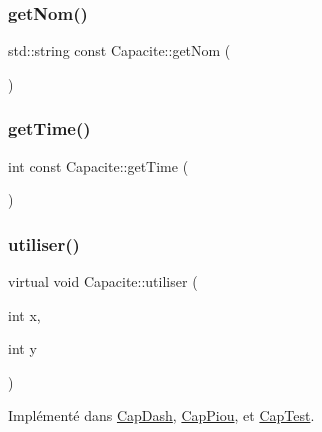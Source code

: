 \mbox{\label{class_capacite_a96218b289768ff461ffaaa0abe014a42}} 
\subsubsection{\texorpdfstring{get\+Nom()}{getNom()}}
{\footnotesize\ttfamily std\+::string const Capacite\+::get\+Nom (\begin{DoxyParamCaption}{ }\end{DoxyParamCaption})\hspace{0.3cm}{\ttfamily [inline]}}

\mbox{\label{class_capacite_a82e4eebf522c02163725872b288bfcf8}} 
\subsubsection{\texorpdfstring{get\+Time()}{getTime()}}
{\footnotesize\ttfamily int const Capacite\+::get\+Time (\begin{DoxyParamCaption}{ }\end{DoxyParamCaption})\hspace{0.3cm}{\ttfamily [inline]}}

\mbox{\label{class_capacite_a4d4f643987fcc2168567bf28a36ea418}} 
\subsubsection{\texorpdfstring{utiliser()}{utiliser()}}
{\footnotesize\ttfamily virtual void Capacite\+::utiliser (\begin{DoxyParamCaption}\item[{int}]{x,  }\item[{int}]{y }\end{DoxyParamCaption})\hspace{0.3cm}{\ttfamily [pure virtual]}}



Implémenté dans \hyperlink{class_cap_dash_ada59ecb62d2c18f6bb6b4acf28a2da93}{Cap\+Dash}, \hyperlink{class_cap_piou_a20ed7a993ce209a3df246f655f107f22}{Cap\+Piou}, et \hyperlink{class_cap_test_af85984f6d9330e5527feff1a62ee4242}{Cap\+Test}.



